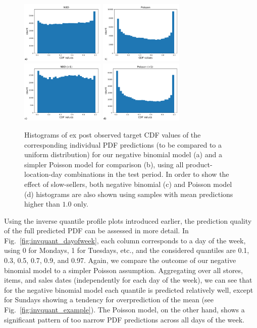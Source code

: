 \documentclass[BCOR=1mm, DIV=calc,10pt,
twoside=true,
twocolumn,
headings=normal]{scrartcl}
\newcommand{\fig}{Fig.~}
\begin{document}
\begin{figure}
\begin{center}
\includegraphics[width=4cm]{figs/cdf_truth_nbinom}
\includegraphics[width=4cm]{figs/cdf_truth_poisson}
\includegraphics[width=4cm]{figs/cdf_truth_nbinom_larger1}
\includegraphics[width=4cm]{figs/cdf_truth_poisson_larger1}
\caption{\label{fig:cdf_demand} Histograms of ex post observed target CDF values of the corresponding individual PDF predictions (to be compared to a uniform distribution) for our negative binomial model (a) and a simpler Poisson model for comparison (b), using all product-location-day combinations in the test period. In order to show the effect of slow-sellers, both negative binomial (c) and Poisson model (d) histograms are also shown using samples with mean predictions higher than $1.0$ only.}
\end{center}
\end{figure}

Using the inverse quantile profile plots introduced earlier, the prediction quality of the full predicted PDF can be assessed in more detail. In \fig \ref{fig:invquant_dayofweek}, each column corresponds to a day of the week, using 0 for Mondays, 1 for Tuesdays, etc., and the considered quantiles are 0.1, 0.3, 0.5, 0.7, 0.9, and 0.97. Again, we compare the outcome of our negative binomial model to a simpler Poisson assumption. Aggregating over all stores, items, and sales dates (independently for each day of the week), we can see that for the negative binomial model each quantile is predicted relatively well, except for Sundays showing a tendency for overprediction of the mean (see \fig \ref{fig:invquant_example}). The Poisson model, on the other hand, shows a significant pattern of too narrow PDF predictions across all days of the week.
\end{document}
